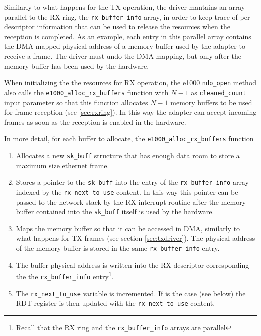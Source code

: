 Similarly to what happens for the TX operation, the driver mantains an array parallel to the RX ring, the \texttt{rx\_buffer\_info} array,
in order to keep trace of per-descriptor information that can be used to release the resources when the reception is completed.
As an example, each entry in this parallel array contains the DMA-mapped physical address of a memory buffer used by the adapter to
receive a frame. The driver must undo the DMA-mapping, but only after the memory buffer has been used by the hardware.

\vspace{0.5cm}

When initializing the the resources for RX operation, the e1000 \texttt{ndo\_open} method also calls the \texttt{e1000\_alloc\_rx\_buffers}
function with $N-1$ as \texttt{cleaned\_count} input parameter so that this function allocates $N-1$ memory buffers to be used for frame 
reception (see \ref{sec:rxring}). In this way the adapter can accept incoming frames as soon as the reception is enabled in the hardware.

In more detail, for each buffer to allocate, the \texttt{e1000\_alloc\_rx\_buffers} function
\begin{enumerate}
    \item Allocates a new \texttt{sk\_buff} structure that has enough data room to store a maximum size ethernet frame.
    
    \item Stores a pointer to the \texttt{sk\_buff} into the entry of the \texttt{rx\_buffer\_info} array indexed by the 
	  \texttt{rx\_next\_to\_use} content. In this way this pointer can be
	  passed to the network stack by the RX interrupt routine after the memory buffer contained into the \texttt{sk\_buff} itself
	  is used by the hardware.
	  
    \item Maps the memory buffer so that it can be accessed in DMA, similarly to what happens for TX frames (see section 
	  \ref{sec:txdriver}). The physical address of the memory buffer is stored in the same \texttt{rx\_buffer\_info} entry.
	  
    \item The buffer physical address is written into the RX descriptor corresponding the the \texttt{rx\_buffer\_info} entry\footnote{
	  Recall that the RX ring and the \texttt{rx\_buffer\_info} arrays are parallel}.
	  
    \item The \texttt{rx\_next\_to\_use} variable is incremented. If is the case (see below) the RDT register is then updated with the 
	  \texttt{rx\_next\_to\_use} content.
\end{enumerate}

